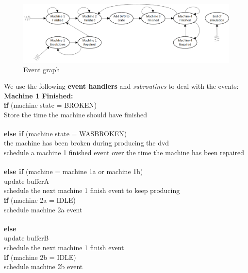 \documentclass[11pt,a4paper]{article}
\newcommand{\tab}{\hspace*{2em}}
\begin{document}
\begin{figure}
\center
\includegraphics[width = 400 pt]{eventgraph.png}
\caption{ Event graph}
\end{figure}


We use the following \textbf{event handlers} and \emph{subroutines} to deal with the events: \\

\noindent \textbf{Machine 1 Finished:}\textbraceleft\\ 
\tab \textbf{if} (machine state = BROKEN) \textbraceleft \\
		  \tab \tab Store the time the machine should have finished\\
	\tab \textbraceright \\
	\tab \textbf{else if} (machine state = WASBROKEN) \textbraceleft \\
	\tab \tab	the machine has been broken during producing the dvd \\
	\tab \tab	schedule a machine 1 finished event over the time the machine has \tab \tab been repaired\\
	\tab \textbraceright \\
	\tab\textbf{ else if }(machine = machine 1a or machine 1b) \textbraceleft \\
		\tab \tab update bufferA \\
		\tab \tab schedule the next machine 1 finish event to keep producing \\
		\tab \tab\textbf{ if} (machine 2a = IDLE) \textbraceleft \\
                      \tab \tab \tab schedule machine 2a event  \\
		\tab \tab \textbraceright  \\
	\tab \textbraceright \textbf{else} \textbraceleft \\
		\tab \tab update bufferB \\
		\tab \tab schedule the next machine 1 finish event  \\	
		\tab \tab\textbf{ if} (machine 2b = IDLE) \textbraceleft  \\
 		\tab\tab \tab 	schedule machine 2b event  \\
		\tab \tab \textbraceright  \\
	\tab \textbraceright  \\
\textbraceright \\
\end{document}
